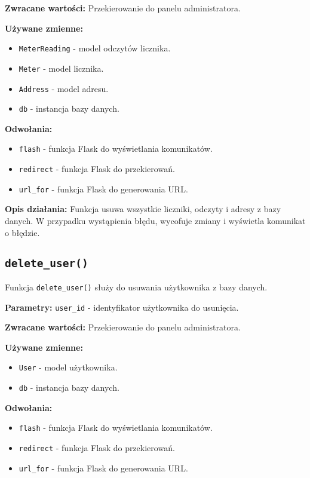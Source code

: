 \documentclass[12pt,a4paper]{report}
\begin{document}
\textbf{Zwracane wartości:} Przekierowanie do panelu administratora.

\textbf{Używane zmienne:}
\begin{itemize}
    \item \texttt{MeterReading} - model odczytów licznika.
    \item \texttt{Meter} - model licznika.
    \item \texttt{Address} - model adresu.
    \item \texttt{db} - instancja bazy danych.
\end{itemize}

\textbf{Odwołania:}
\begin{itemize}
    \item \texttt{flash} - funkcja Flask do wyświetlania komunikatów.
    \item \texttt{redirect} - funkcja Flask do przekierowań.
    \item \texttt{url\_for} - funkcja Flask do generowania URL.
\end{itemize}

\textbf{Opis działania:}
Funkcja usuwa wszystkie liczniki, odczyty i adresy z bazy danych. W przypadku wystąpienia błędu, wycofuje zmiany i wyświetla komunikat o błędzie.

\subsection{\texttt{delete\_user()}}
\label{sec:delete_user}
Funkcja \texttt{delete\_user()} służy do usuwania użytkownika z bazy danych.

\textbf{Parametry:} \texttt{user\_id} - identyfikator użytkownika do usunięcia.

\textbf{Zwracane wartości:} Przekierowanie do panelu administratora.

\textbf{Używane zmienne:}
\begin{itemize}
    \item \texttt{User} - model użytkownika.
    \item \texttt{db} - instancja bazy danych.
\end{itemize}

\textbf{Odwołania:}
\begin{itemize}
    \item \texttt{flash} - funkcja Flask do wyświetlania komunikatów.
    \item \texttt{redirect} - funkcja Flask do przekierowań.
    \item \texttt{url\_for} - funkcja Flask do generowania URL.
\end{itemize}
\end{document}
